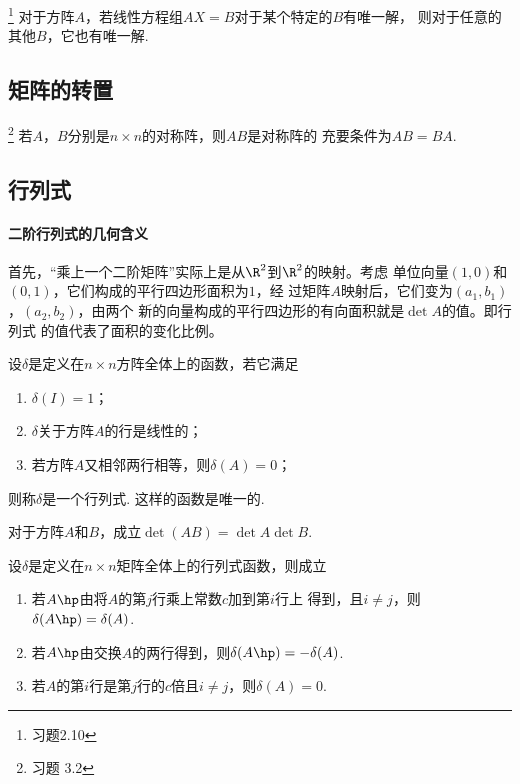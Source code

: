   \begin{pos}\footnote{习题2.10}
    对于方阵$A$，若线性方程组$AX=B$对于某个特定的$B$有唯一解，
    则对于任意的其他$B$，它也有唯一解.
  \end{pos}

\subsection{矩阵的转置}
   \begin{pos}\footnote{习题 3.2}
     若$A$，$B$分别是$n\times n$的对称阵，则$AB$是对称阵的
     充要条件为$AB=BA$.
   \end{pos}

\subsection{行列式}

  \paragraph{二阶行列式的几何含义}
    首先，“乘上一个二阶矩阵”实际上是从$\R^2$到$\R^2$的映射。考虑
    单位向量$(1,0)$和$(0,1)$，它们构成的平行四边形面积为$1$，经
    过矩阵$A$映射后，它们变为$(a_1,b_1)$，$(a_2,b_2)$，由两个
    新的向量构成的平行四边形的有向面积就是$\det A$的值。即行列式
    的值代表了面积的变化比例。

  \begin{thm}[行列式的唯一性]
    设$\delta$是定义在$n\times n$方阵全体上的函数，若它满足
    \begin{enumerate}
      \item $\delta(I)=1$；
      \item $\delta$关于方阵$A$的行是线性的；
      \item 若方阵$A$又相邻两行相等，则$\delta(A)=0$；
    \end{enumerate}
    则称$\delta$是一个行列式. 这样的函数是唯一的.
  \end{thm}

  \begin{thm}
    对于方阵$A$和$B$，成立$\det(AB)=\det A\det B$.
  \end{thm}

  \begin{thm}[行列式的性质]
    设$\delta$是定义在$n\times n$矩阵全体上的行列式函数，则成立
    \begin{enumerate}
      \item 若$A\hp$由将$A$的第$j$行乘上常数$c$加到第$i$行上
        得到，且$i\ne j$，则$\delta(A\hp) = \delta(A)$.
      \item 若$A\hp$由交换$A$的两行得到，则$\delta(A\hp)
        =-\delta(A)$.
      \item 若$A$的第$i$行是第$j$行的$c$倍且$i\ne j$，则$\delta
        (A)=0$.
    \end{enumerate}
  \end{thm}
  \proof
    


